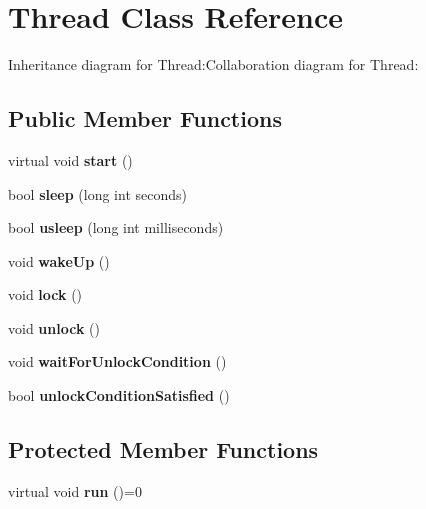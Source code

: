 \section{Thread Class Reference}
\label{classbr_1_1ufscar_1_1lince_1_1ginga_1_1recommender_1_1Thread}
Inheritance diagram for Thread:Collaboration diagram for Thread:\subsection*{Public Member Functions}
\begin{CompactItemize}
\item 
virtual void \textbf{start} ()\label{classbr_1_1ufscar_1_1lince_1_1ginga_1_1recommender_1_1Thread_62b63bddf378b0e13a4affa3e8e1bedf}

\item 
bool \textbf{sleep} (long int seconds)\label{classbr_1_1ufscar_1_1lince_1_1ginga_1_1recommender_1_1Thread_64ab85597670968882be4168ad15dba0}

\item 
bool \textbf{usleep} (long int milliseconds)\label{classbr_1_1ufscar_1_1lince_1_1ginga_1_1recommender_1_1Thread_17fec2aaebe4558a2fbe9d0b7019ca8c}

\item 
void \textbf{wakeUp} ()\label{classbr_1_1ufscar_1_1lince_1_1ginga_1_1recommender_1_1Thread_079d49a5302222debfe4dc54cf7a5c7a}

\item 
void \textbf{lock} ()\label{classbr_1_1ufscar_1_1lince_1_1ginga_1_1recommender_1_1Thread_a81aed607133209dade63a226818224d}

\item 
void \textbf{unlock} ()\label{classbr_1_1ufscar_1_1lince_1_1ginga_1_1recommender_1_1Thread_9278be8203e1c42e2619179882ae4403}

\item 
void \textbf{waitForUnlockCondition} ()\label{classbr_1_1ufscar_1_1lince_1_1ginga_1_1recommender_1_1Thread_11d95b5a2785d3e39044764c3c57da0c}

\item 
bool \textbf{unlockConditionSatisfied} ()\label{classbr_1_1ufscar_1_1lince_1_1ginga_1_1recommender_1_1Thread_082a67ba63d4a3d34236820b1629ea56}

\end{CompactItemize}
\subsection*{Protected Member Functions}
\begin{CompactItemize}
\item 
virtual void \textbf{run} ()=0\label{classbr_1_1ufscar_1_1lince_1_1ginga_1_1recommender_1_1Thread_18954417d3124a8095783ea13dc6d00b}

\end{CompactItemize}
